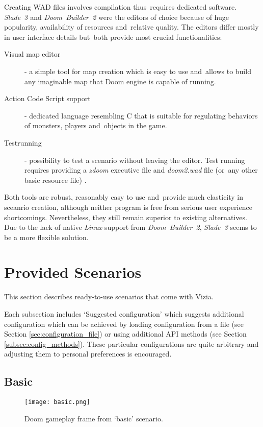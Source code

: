 	Creating WAD files involves compilation thus~requires dedicated software. \emph{Slade~3} and \emph{Doom~Builder~2} were the editors of choice because of huge popularity, availability of resources and~relative quality. The editors differ mostly in user interface details but~both provide most crucial functionalities:

	\begin{description}
		\item [Visual map editor] - a simple tool for map creation which is easy to use and~allows to build any imaginable map that Doom engine is capable of running.
		\item [Action Code Script support] - dedicated language resembling C that is suitable for regulating behaviors of monsters, players and~objects in the game.
		\item [Testrunning] - possibility to test a scenario without leaving the editor. Test running requires providing a \emph{zdoom} executive file and \emph{doom2.wad} file (or~any other basic resource file) . 
	\end{description}

	Both tools are robust, reasonably easy to use and~provide much elasticity in sceanrio creation, although neither program is free from serious user experience shortcomings. Nevertheless, they still remain superior to existing alternatives. Due to the lack of native \emph{Linux} support from \emph{Doom~Builder~2}, \emph{Slade~3} seems to be a more flexible solution. 

	\newpage
\section{Provided Scenarios}\label{sec:scenarios}
	This section describes ready-to-use scenarios that come with Vizia.

	Each subsection includes `Suggested configuration' which suggests additional configuration which can be achieved by loading	configuration from a file (see Section \ref{sec:configuration_file}) or using additional API methods (see Section \ref{subsec:config_methods}). These particular configurations are quite arbitrary and adjusting them to personal preferences is encouraged.

	\subsection{Basic}\label{subsec:basic}
		
		\begin{figure}
			\centering
			\texttt{[image: basic.png]}
			\caption{Doom gameplay frame from `basic' scenario.}\label{fig:basic}
		\end{figure}

